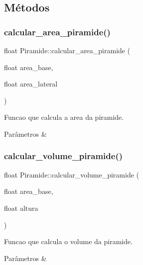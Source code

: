 \subsection{Métodos}
\mbox{\label{classPiramide_af728486b416f8613534458aa23d5f829}} 
\subsubsection{\texorpdfstring{calcular\+\_\+area\+\_\+piramide()}{calcular\_area\_piramide()}}
{\footnotesize\ttfamily float Piramide\+::calcular\+\_\+area\+\_\+piramide (\begin{DoxyParamCaption}\item[{float}]{area\+\_\+base,  }\item[{float}]{area\+\_\+lateral }\end{DoxyParamCaption})}



Funcao que calcula a area da piramide. 


\begin{DoxyParams}{Parâmetros}
{\em } & \\
\hline
\end{DoxyParams}
\mbox{\label{classPiramide_a610ee9556dc701e27f8fc1efdd6d17c1}} 
\subsubsection{\texorpdfstring{calcular\+\_\+volume\+\_\+piramide()}{calcular\_volume\_piramide()}}
{\footnotesize\ttfamily float Piramide\+::calcular\+\_\+volume\+\_\+piramide (\begin{DoxyParamCaption}\item[{float}]{area\+\_\+base,  }\item[{float}]{altura }\end{DoxyParamCaption})}



Funcao que calcula o volume da piramide. 


\begin{DoxyParams}{Parâmetros}
{\em } & \\
\hline
\end{DoxyParams}
\mbox{\label{classPiramide_aa70bdfef3f2974420224bfc043727193}} 
